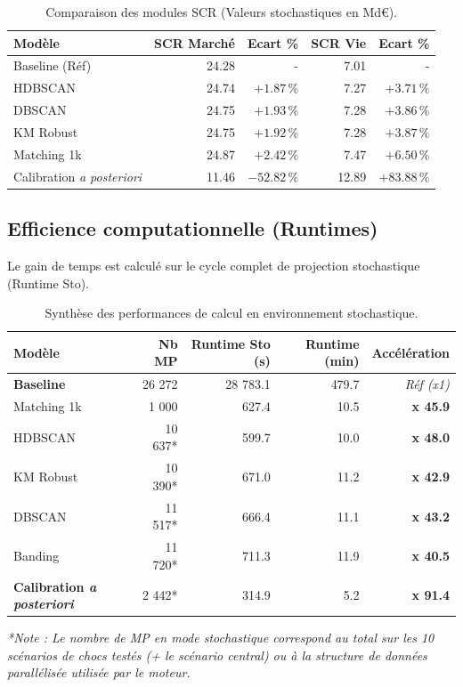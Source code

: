 \begin{table}[htbp]
    \centering
    \begin{tabular}{|l|r|r|r|r|}
        \hline
        \textbf{Modèle} & \textbf{SCR Marché} & \textbf{Ecart \%} & \textbf{SCR Vie} & \textbf{Ecart \%} \\
        \hline
        Baseline (Réf) & 24.28 & - & 7.01 & - \\
        \hline
        HDBSCAN & 24.74 & $+1.87\,\%$ & 7.27 & $+3.71\,\%$ \\
        DBSCAN & 24.75 & $+1.93\,\%$ & 7.28 & $+3.86\,\%$ \\
        KM Robust & 24.75 & $+1.92\,\%$ & 7.28 & $+3.87\,\%$ \\
        Matching 1k & 24.87 & $+2.42\,\%$ & 7.47 & $+6.50\,\%$ \\
        Calibration \textit{a posteriori} & 11.46 & $-52.82\,\%$ & 12.89 & $+83.88\,\%$ \\
        \hline
    \end{tabular}
    \caption{Comparaison des modules SCR (Valeurs stochastiques en Md€).}
\end{table}

\subsection*{Efficience computationnelle (Runtimes)}
\label{annexe:runtimes}

Le gain de temps est calculé sur le cycle complet de projection stochastique (Runtime Sto).

\begin{table}[htbp]
    \centering
    \renewcommand{\arraystretch}{1.3}
    \begin{tabular}{|l|r|r|r|r|}
        \hline
        \textbf{Modèle} & \textbf{Nb MP} & \textbf{Runtime Sto (s)} & \textbf{Runtime (min)} & \textbf{Accélération} \\
        \hline
        \textbf{Baseline} & 26 272 & 28 783.1 & 479.7 & \textit{Réf (x1)} \\
        \hline
        Matching 1k & 1 000 & 627.4 & 10.5 & \textbf{x 45.9} \\
        HDBSCAN & 10 637* & 599.7 & 10.0 & \textbf{x 48.0} \\
        KM Robust & 10 390* & 671.0 & 11.2 & \textbf{x 42.9} \\
        DBSCAN & 11 517* & 666.4 & 11.1 & \textbf{x 43.2} \\
        Banding & 11 720* & 711.3 & 11.9 & \textbf{x 40.5} \\
        \hline
        \textbf{Calibration \textit{a posteriori}} & 2 442* & 314.9 & 5.2 & \textbf{x 91.4} \\
        \hline
    \end{tabular}
    \caption{Synthèse des performances de calcul en environnement stochastique.}
    \label{tab:annexe_runtimes}
\end{table}
\textit{*Note : Le nombre de MP en mode stochastique correspond au total sur les 10 scénarios de chocs testés (+ le scénario central) ou à la structure de données parallélisée utilisée par le moteur.}